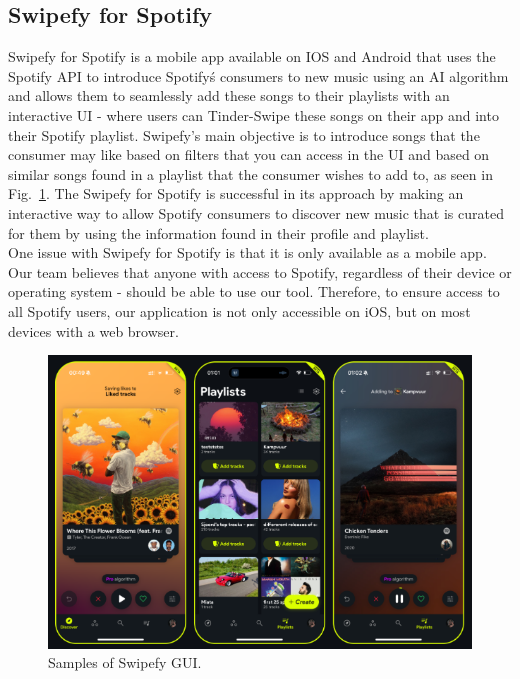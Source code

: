 \documentclass{article}
\begin{document}
\pagebreak

\subsection{Swipefy for Spotify}
\quad Swipefy for Spotify is a mobile app available on IOS and Android that uses the Spotify API to introduce Spotify\'s consumers to new music using an AI algorithm and allows them to seamlessly add these songs to their playlists with an interactive UI - where users can Tinder-Swipe these songs on their app and into their Spotify playlist. \cite{swipefy} Swipefy’s main objective is to introduce songs that the consumer may like based on filters that you can access in the UI and based on similar songs found in a playlist that the consumer wishes to add to, as seen in Fig.~\ref{fig:swipey}. The Swipefy for Spotify is successful in its approach by making an interactive way to allow Spotify consumers to discover new music that is curated for them by using the information found in their profile and playlist. \\

One issue with Swipefy for Spotify is that it is only available as a mobile app. Our team believes that anyone with access to Spotify, regardless of their device or operating system - should be able to use our tool. Therefore, to ensure access to all Spotify users, our application is not only accessible on iOS, but on most devices with a web browser.

\begin{figure}[ht]
  \centering
  \includegraphics[width=5in]{./swipefyss.png}
  \caption{Samples of Swipefy GUI.}
  \label{fig:swipey}
\end{figure}
\end{document}
